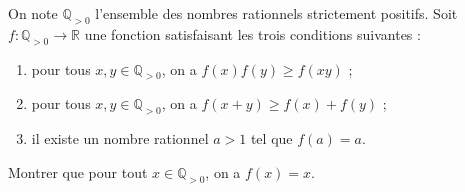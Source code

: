 On note $\mathbb{Q}_{>0}$ l'ensemble des nombres rationnels strictement positifs. Soit
$f : \mathbb{Q}_{>0} \to \mathbb{R}$ une fonction satisfaisant les trois conditions suivantes :
\begin{enumerate}
  \item[(i)] pour tous $x, y \in \mathbb{Q}_{>0}$, on a $f(x)f(y) \geq f(xy)$ ;
  \item[(ii)] pour tous $x, y \in \mathbb{Q}_{>0}$, on a $f(x + y) \geq f(x) + f(y)$ ;
  \item[(iii)] il existe un nombre rationnel $a > 1$ tel que $f(a) = a$.
\end{enumerate}
Montrer que pour tout $x \in \mathbb{Q}_{>0}$, on a $f(x) = x$.
